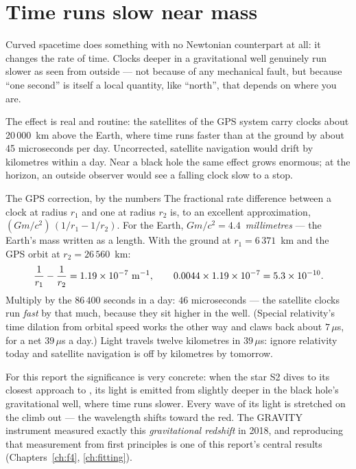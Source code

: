 \section{Time runs slow near mass}

Curved spacetime does something with no Newtonian counterpart at all: it
changes the rate of time. Clocks deeper in a gravitational well genuinely
run slower as seen from outside — not because of any mechanical fault, but
because ``one second'' is itself a local quantity, like ``north'', that
depends on where you are.

The effect is real and routine: the satellites of the GPS system carry
clocks about 20\,000~km above the Earth, where time runs faster than at
the ground by about 45 microseconds per day. Uncorrected, satellite
navigation would drift by kilometres within a day. Near a black hole the
same effect grows enormous; at the horizon, an outside observer would see
a falling clock slow to a stop.

\begin{worked}{The GPS correction, by the numbers}
The fractional rate difference between a clock at radius $r_1$ and one
at radius $r_2$ is, to an excellent approximation,
$(Gm/c^2)\,(1/r_1 - 1/r_2)$. For the Earth,
$Gm/c^2 = 4.4$~\emph{millimetres} — the Earth's mass written as a
length. With the ground at $r_1 = 6\,371$~km and the GPS orbit at
$r_2 = 26\,560$~km:
\[
\frac{1}{r_1}-\frac{1}{r_2} = 1.19\times10^{-7}~{\rm m}^{-1},
\qquad
0.0044\times1.19\times10^{-7} = 5.3\times10^{-10}.
\]
Multiply by the $86\,400$ seconds in a day: $46$ microseconds — the
satellite clocks run \emph{fast} by that much, because they sit higher
in the well. (Special relativity's time dilation from orbital speed
works the other way and claws back about $7\,\mu$s, for a net
$39\,\mu$s a day.) Light travels twelve kilometres in $39\,\mu$s:
ignore relativity today and satellite navigation is off by kilometres
by tomorrow.
\end{worked}

For this report the significance is very concrete: when the star S2 dives
to its closest approach to \sgra{}, its light is emitted from slightly
deeper in the black hole's gravitational well, where time runs slower.
Every wave of its light is stretched on the climb out — the wavelength
shifts toward the red. The GRAVITY instrument measured exactly this
\emph{gravitational redshift} in 2018, and reproducing that measurement
from first principles is one of this report's central results
(Chapters~\ref{ch:f4}, \ref{ch:fitting}).

